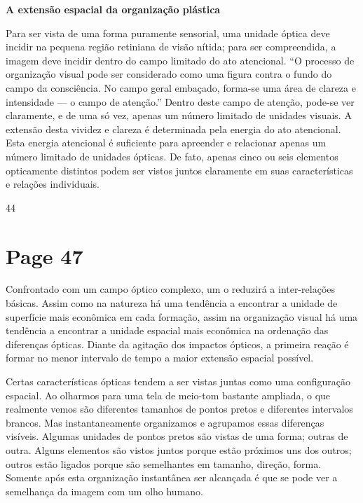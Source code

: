 \documentclass[a4paper]{article}
\begin{document}
\vspace{2em}

\centering
\textbf{\large A extensão espacial da organização plástica}
\par
\noindent Para ser vista de uma forma puramente sensorial, uma unidade óptica deve incidir na pequena região retiniana de visão nítida; para ser compreendida, a imagem deve incidir dentro do campo limitado do ato atencional. ``O processo de organização visual pode ser considerado como uma figura contra o fundo do campo da consciência. No campo geral embaçado, forma-se uma área de clareza e intensidade --- o campo de atenção.'' Dentro deste campo de atenção, pode-se ver claramente, e de uma só vez, apenas um número limitado de unidades visuais. A extensão desta vividez e clareza é determinada pela energia do ato atencional. Esta energia atencional é suficiente para apreender e relacionar apenas um número limitado de unidades ópticas. De fato, apenas cinco ou seis elementos opticamente distintos podem ser vistos juntos claramente em suas características e relações individuais.

\vfill
\raggedright
44

\newpage
\section*{Page 47}

Confrontado com um campo óptico complexo, um o reduzirá a inter-relações básicas. Assim como na natureza há uma tendência a encontrar a unidade de superfície mais econômica em cada formação, assim na organização visual há uma tendência a encontrar a unidade espacial mais econômica na ordenação das diferenças ópticas. Diante da agitação dos impactos ópticos, a primeira reação é formar no menor intervalo de tempo a maior extensão espacial possível.

Certas características ópticas tendem a ser vistas juntas como uma configuração espacial. Ao olharmos para uma tela de meio-tom bastante ampliada, o que realmente vemos são diferentes tamanhos de pontos pretos e diferentes intervalos brancos. Mas instantaneamente organizamos e agrupamos essas diferenças visíveis. Algumas unidades de pontos pretos são vistas de uma forma; outras de outra. Alguns elementos são vistos juntos porque estão próximos uns dos outros; outros estão ligados porque são semelhantes em tamanho, direção, forma. Somente após esta organização instantânea ser alcançada é que se pode ver a semelhança da imagem com um olho humano.
\end{document}
